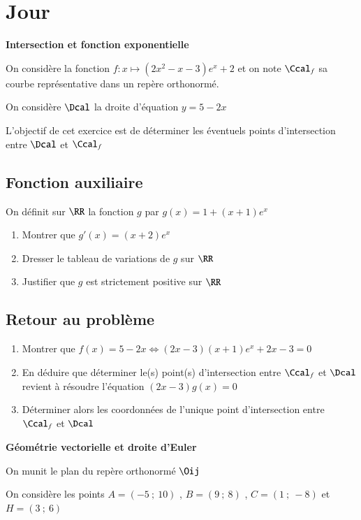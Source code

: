 \documentclass[oneside,12pt]{article}
\let\stdsection\section
\renewcommand{\section}{\stdsection}
\let\oldsection\section
\renewcommand{\section}{\newpage\oldsection}
\begin{document}
\section{Jour }

\textbf{\huge Intersection et fonction exponentielle}

On considère la fonction $f:x\mapsto (2x^2-x-3)e^x+2$ et on note $\Ccal_f$ sa courbe représentative dans un repère orthonormé.

On considère $\Dcal$ la droite d'équation $y=5-2x$

L'objectif de cet exercice est de déterminer les éventuels points d'intersection entre $\Dcal$ et $\Ccal_f$

\subsection{Fonction auxiliaire}
On définit sur $\RR$ la fonction $g$ par $g(x)=1+(x+1)e^x$
\begin{enumerate}
	\item Montrer que $g'(x)=(x+2)e^x$
	\item Dresser le tableau de variations de $g$ sur $\RR$
	\item Justifier que $g$ est strictement positive sur $\RR$
\end{enumerate}

\subsection{Retour au problème}
\begin{enumerate}
	\item Montrer que $f(x)=5-2x \Longleftrightarrow (2x-3)(x+1)e^x+2x-3=0$
	\item En déduire que déterminer le(s) point(s) d'intersection entre $\Ccal_f$ et $\Dcal$ revient à résoudre l'équation $(2x-3)g(x)=0$
	\item Déterminer alors les coordonnées de l'unique point d'intersection entre $\Ccal_f$ et $\Dcal$
\end{enumerate}


\vspace{1cm} \hrulefill \vspace{1cm}


\textbf{\huge Géométrie vectorielle et droite d'Euler}

On munit le plan du repère orthonormé $\Oij$

On considère les points $A=(-5~;~10)$  , $B=(9~;~8)$ , $C=(1~;~-8)$ et $H=(3~;~6)$
\end{document}
